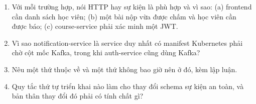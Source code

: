 \begin{quiz}
\begin{enumerate}
  \item Với mỗi trường hợp, nói HTTP hay sự kiện là phù hợp và vì sao:
  (a) frontend cần danh sách học viên; (b) một bài nộp vừa được chấm và
  học viên cần được báo; (c) course-service phải xác minh một JWT.
  \item Vì sao notification-service là service duy nhất có manifest
  Kubernetes phải chờ cột mốc Kafka, trong khi auth-service cũng dùng
  Kafka?
  \item Nêu một thứ thuộc về  và một thứ không bao giờ nên
  ở đó, kèm lập luận.
  \item Quy tắc thứ tự triển khai nào làm cho thay đổi schema sự kiện
  an toàn, và bản thân thay đổi đó phải có tính chất gì?
\end{enumerate}
\end{quiz}
